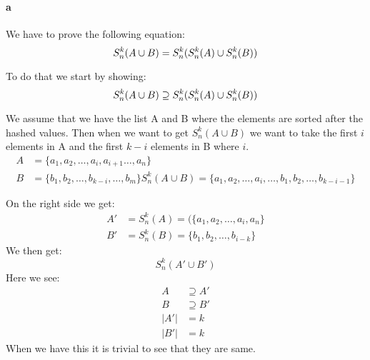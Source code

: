 \paragraph{a}
We have to prove the following equation:
\begin{equation*}
    S^{k}_{n}(A \cup B) = S^{k}_{n}(S^{k}_{n}(A) \cup S^{k}_{n}(B))\\
\end{equation*}

To do that we start by showing:
\begin{equation*}
    S^{k}_{n}(A \cup B) \supseteq S^{k}_{n}(S^{k}_{n}(A) \cup S^{k}_{n}(B))\\
\end{equation*}

We assume that we have the list A and B where the elements are sorted after the
hashed values. Then when we want to get $S^{k}_{n}(A\cup B)$ we want to take
the first $i$ elements in A and the first $k-i$ elements in B where $i$.
\begin{align*}
    A &=\{a_1, a_2, \dots , a_{i}, a_{i+1} \dots  , a_n\}\\
    B &=\{b_1, b_2, \dots , b_{k-i}, \dots , b_m\}
    S^{k}_{n}(A\cup B) =\{a_1, a_2, \dots , a_{i}, \dots,  b_1, b_2, \dots , b_{k-i-1}\}
\end{align*}

On the right side we get:
\begin{align*}
    A' &= S^{k}_{n}(A) = (\{a_1, a_2, \dots , a_{i}, a_{n}\}\\
    B' &= S^{k}_{n}(B) = \{b_1, b_2, \dots , b_{i-k}\}
\end{align*}
We then get:
\begin{equation*}
    S^{k}_{n}(A' \cup B')
\end{equation*}
Here we see:
\begin{align*}
    A &\supseteq A'\\
    B &\supseteq B'\\
    |A'| &= k\\
    |B'| &= k
\end{align*}
When we have this it is trivial to see that they are same.
